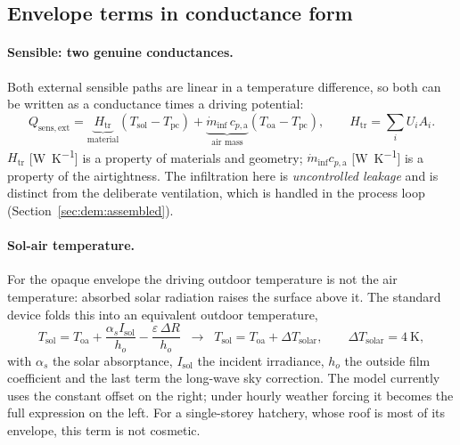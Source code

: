 \subsection{Envelope terms in conductance form}
\label{sec:dem:envelope}

\paragraph{Sensible: two genuine conductances.} Both external sensible paths are
linear in a temperature difference, so both can be written as a conductance times
a driving potential:
\begin{equation}
Q_{\mathrm{sens,ext}}
=\underbrace{H_{\mathrm{tr}}}_{\text{material}}\left(T_{\mathrm{sol}}-T_{\mathrm{pc}}\right)
+\underbrace{\dot m_{\mathrm{inf}}\,c_{p,\mathrm{a}}}_{\text{air mass}}
\left(T_{\mathrm{oa}}-T_{\mathrm{pc}}\right),
\qquad H_{\mathrm{tr}}=\sum_i U_iA_i .
\label{eq:dem:Qsensext}
\end{equation}
$H_{\mathrm{tr}}$ [\si{\watt\per\kelvin}] is a property of materials and
geometry; $\dot m_{\mathrm{inf}}c_{p,\mathrm{a}}$ [\si{\watt\per\kelvin}] is a
property of the airtightness. The infiltration here is \emph{uncontrolled
leakage} and is distinct from the deliberate ventilation, which is handled in the
process loop (Section~\ref{sec:dem:assembled}).

\paragraph{Sol-air temperature.} For the opaque envelope the driving outdoor
temperature is not the air temperature: absorbed solar radiation raises the
surface above it. The standard device folds this into an equivalent outdoor
temperature,
\begin{equation}
T_{\mathrm{sol}}=T_{\mathrm{oa}}
+\frac{\alpha_s I_{\mathrm{sol}}}{h_o}-\frac{\varepsilon\,\Delta R}{h_o}
\;\;\longrightarrow\;\;
T_{\mathrm{sol}}=T_{\mathrm{oa}}+\Delta T_{\mathrm{solar}},
\qquad \Delta T_{\mathrm{solar}}=\SI{4}{\kelvin},
\label{eq:dem:solair}
\end{equation}
with $\alpha_s$ the solar absorptance, $I_{\mathrm{sol}}$ the incident
irradiance, $h_o$ the outside film coefficient and the last term the long-wave
sky correction. The model currently uses the constant offset on the right; under
hourly weather forcing it becomes the full expression on the left. For a
single-storey hatchery, whose roof is most of its envelope, this term is not
cosmetic.

